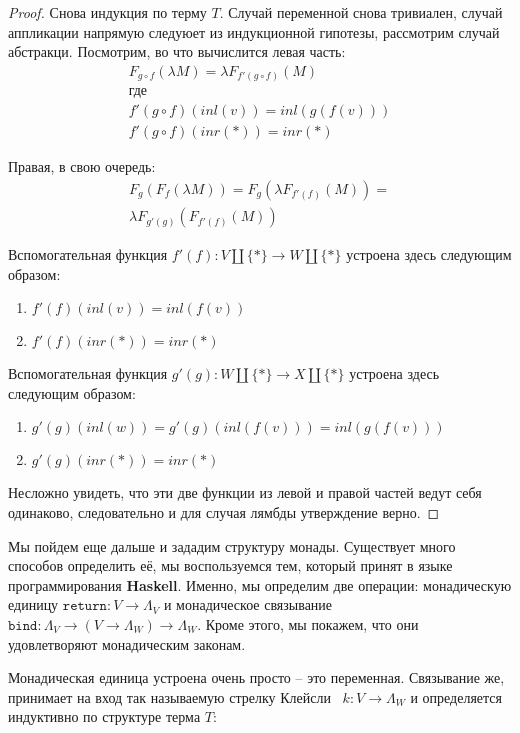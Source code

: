 \begin{proof}
  Снова индукция по терму $T$. Случай переменной снова тривиален, случай аппликации напрямую следуюет из индукционной гипотезы, рассмотрим случай абстракци. Посмотрим, во что вычислится левая часть:
  \begin{gather*}
    F_{g \circ f}(\lambda M) = \lambda F_{f'(g \circ f)}(M) \\
    \text{где} \\
    f'(g \circ f)(inl(v)) = inl(g(f(v))) \\
    f'(g \circ f)(inr(*)) = inr(*)
  \end{gather*}

  Правая, в свою очередь:
  \begin{gather*}
    F_{g}(F_{f}(\lambda M)) = F_{g}(\lambda F_{f'(f)}(M)) = \\
    \lambda F_{g'(g)}(F_{f'(f)}(M))
  \end{gather*}

  Вспомогательная функция $f'(f) : V \coprod \{*\} \to W \coprod \{*\}$ устроена здесь следующим образом:
  \begin{enumerate}
    \item $f'(f)(inl(v)) = inl(f(v))$
    \item $f'(f)(inr(*)) = inr(*)$
  \end{enumerate}

  Вспомогательная функция $g'(g) : W \coprod \{*\} \to X \coprod \{*\}$ устроена здесь следующим образом:
  \begin{enumerate}
    \item $g'(g)(inl(w)) = g'(g)(inl(f(v))) = inl(g(f(v)))$
    \item $g'(g)(inr(*)) = inr(*)$
  \end{enumerate}

  Несложно увидеть, что эти две функции из левой и правой частей ведут себя одинаково, следовательно и для случая лямбды утверждение верно.
\end{proof}

Мы пойдем еще дальше и зададим структуру монады. Существует много способов определить её, мы воспользуемся тем, который принят в языке программирования \textbf{Haskell}. Именно, мы определим две операции: монадическую единицу $\texttt{return} : V \to \Lambda_{V}$ и монадическое связывание $\texttt{bind} : \Lambda_{V} \to (V \to \Lambda_{W}) \to \Lambda_{W}$. Кроме этого, мы покажем, что они удовлетворяют монадическим законам.

Монадическая единица устроена очень просто -- это переменная. Связывание же, принимает на вход так называемую стрелку Клейсли~\cite{kleisliArrows} $k : V \to \Lambda_{W}$ и определяется индуктивно по структуре терма $T$:

